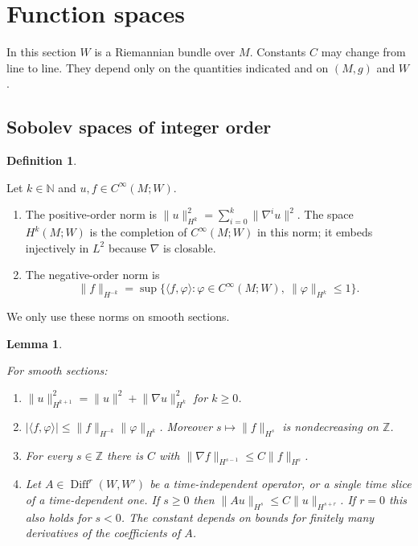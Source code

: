\documentclass[11pt,reqno]{amsart}
\newtheorem{lemma}[theorem]{Lemma}
\theoremstyle{definition}
\newtheorem{definition}[theorem]{Definition}
\theoremstyle{remark}
\newcommand{\N}{\mathbb{N}}
\newcommand{\Diff}{\operatorname{Diff}}
\newcommand{\ip}[2]{\langle #1,#2\rangle}
\newcommand{\norm}[1]{\lVert #1\rVert}
\newcommand{\abs}[1]{\lvert #1\rvert}
\newcommand{\lean}[1]{}
\newcommand{\uses}[1]{}
\numberwithin{equation}{section}
\begin{document}
\section{Function spaces}\label{sec:spaces}

In this section $W$ is a Riemannian bundle over $M$. Constants $C$ may change from line to line. They
depend only on the quantities indicated and on $(M,g)$ and $W$.

\subsection{Sobolev spaces of integer order}

\begin{definition}\label{def:sobolev}
\lean{ShortTime.sobolevNormSq, ShortTime.negSobolevNorm, ShortTime.hNormSq}
Let $k\in\N$ and $u,f\in C^\infty(M;W)$.
\begin{enumerate}[nosep]
\item The positive-order norm is $\norm{u}_{H^k}^2=\sum_{i=0}^k\norm{\nabla^iu}^2$. The space
  $H^k(M;W)$ is the completion of $C^\infty(M;W)$ in this norm; it embeds injectively in $L^2$ because
  $\nabla$ is closable.
\item The negative-order norm is
  \[
    \norm{f}_{H^{-k}}=\sup\{\ip{f}{\varphi}:\varphi\in C^\infty(M;W),\ \norm{\varphi}_{H^k}\le1\}.
  \]
\end{enumerate}
We only use these norms on smooth sections.
\end{definition}

\begin{lemma}\label{lem:sobolev-basic}
\lean{ShortTime.sobolevNormSq_succ, ShortTime.inner_le_negSobolevNorm, ShortTime.exists_negSobolevNorm_covGrad_le, ShortTime.exists_sobolevNormSq_opField_le, ShortTime.exists_negSobolevNorm_opField_covGrad_le, ShortTime.sobolevNorm_diffOp_le}
\uses{def:sobolev}
For smooth sections:
\begin{enumerate}[label=(\roman*),nosep]
\item $\norm{u}_{H^{k+1}}^2=\norm{u}^2+\norm{\nabla u}_{H^k}^2$ for $k\ge0$.
\item $\abs{\ip{f}{\varphi}}\le\norm f_{H^{-k}}\norm\varphi_{H^k}$. Moreover $s\mapsto\norm f_{H^s}$
  is nondecreasing on $\mathbb Z$.
\item For every $s\in\mathbb Z$ there is $C$ with $\norm{\nabla f}_{H^{s-1}}\le C\norm f_{H^s}$.
\item Let $A\in\Diff^r(W,W')$ be a time-independent operator, or a single time slice of a
  time-dependent one. If $s\ge0$ then $\norm{Au}_{H^s}\le C\norm{u}_{H^{s+r}}$. If $r=0$ this also
  holds for $s<0$. The constant depends on bounds for finitely many derivatives of the coefficients of
  $A$.
\end{enumerate}
\end{lemma}
\end{document}
